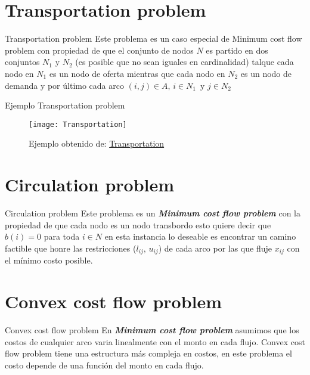 \documentclass{beamer}
\newcommand{\mcf}{{\bfseries \textit{Minimum cost flow problem}} }
\begin{document}
\section{Transportation problem}

\begin{frame}{Transportation problem}
 Este problema es un caso especial de Minimum cost flow problem con propiedad de que el conjunto de nodos $N$ es partido en dos conjuntos $N_1$ y $N_2$ (es posible que no sean iguales en cardinalidad) talque cada nodo en $N_1$ es un nodo de oferta mientras que cada nodo en $N_2$ es un nodo de demanda y por último cada arco $(i,j) \in A, \, i \in N_1 \, \text{ y } j \in N_2 $
\end{frame}

\begin{frame}{Ejemplo Transportation problem}
 \begin{figure}
  \centering
  \texttt{[image: Transportation]}
  \caption{Ejemplo obtenido de: \href{https://towardsdatascience.com/operations-research-in-r-transportation-problem-1df59961b2ad}{Transportation}}
 \end{figure}

\end{frame}

\section{Circulation problem}
\begin{frame}{Circulation problem}
 Este problema es un \mcf con la propiedad de que cada nodo es un nodo transbordo esto quiere decir que $b(i) = 0$ para toda $i \in N$ en esta instancia lo deseable es encontrar un camino factible que honre las restricciones ($l_{ij}, \, u_{ij}$) de cada arco por las que fluje $x_{ij}$ con el mínimo costo posible.
\end{frame}


\section{Convex cost flow problem}
\begin{frame}{Convex cost flow problem}
 En \mcf asumimos que los costos de cualquier arco varia linealmente con el monto en cada flujo. Convex cost flow problem tiene una estructura más compleja en costos, en este problema el costo depende de una función del monto en cada flujo.
\end{frame}
\end{document}
